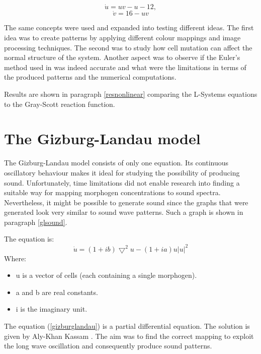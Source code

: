 $$\dot{u} = uv - u - 12,$$
\begin{equation}
\label{lsystems}
\dot{v} = 16 - uv
\end{equation}

The same concepts were used and expanded into testing different ideas. The first idea was to create patterns by applying  different colour mappings and image processing techniques. The second was to study how cell mutation can affect the normal structure of the system. Another aspect was to observe if the Euler's method used in \cite{website:jennings} was indeed accurate and what were the limitations in terms of the produced patterns and the numerical computations.

Results are shown in paragraph \ref{resnonlinear} comparing the L-Systems equations to the Gray-Scott reaction function.

\section{The Gizburg-Landau model}

The Gizburg-Landau model consists of only one equation. Its continuous oscillatory behaviour makes it ideal for studying the possibility of producing sound. Unfortunately, time limitations did not enable research into finding a suitable way for mapping morphogen concentrations to sound spectra. Nevertheless, it might be possible to generate sound since the graphs that were generated look very similar to sound wave patterns. Such a graph is shown in paragraph \ref{glsound}.

The equation is:
\begin{equation}
\label{gizburglandau}
\dot{u} = (1+ib) \bigtriangledown^2u-(1+ia)u|u|^2
\end{equation}
Where: 
\begin{itemize}
\item u is a vector of cells (each containing a single morphogen).
\item a and b are real constants. 
\item i is the imaginary unit. 
\end{itemize}

The equation (\ref{gizburglandau}) is a partial differential equation. The solution is given by Aly-Khan Kassam \cite{kassam_solving_2003}. The aim was to find the correct mapping to exploit the long wave oscillation and consequently produce sound patterns.
